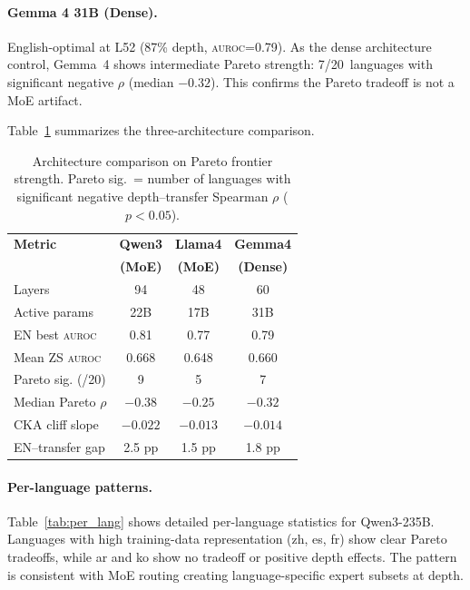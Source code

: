 \documentclass[11pt,a4paper]{article}
\newcommand{\aur}{\textsc{auroc}}
\newcommand{\cka}{\textsc{CKA}}
\begin{document}
\paragraph{Gemma 4 31B (Dense).} English-optimal at L52 (87\% depth, \aur{}=0.79). As the dense architecture control, Gemma~4 shows intermediate Pareto strength: 7/20~languages with significant negative $\rho$ (median $-0.32$). This confirms the Pareto tradeoff is not a MoE artifact.

Table~\ref{tab:arch_comparison} summarizes the three-architecture comparison.

\begin{table}[t]
\centering
\small
\begin{tabular}{lccc}
\toprule
\textbf{Metric} & \textbf{Qwen3} & \textbf{Llama4} & \textbf{Gemma4} \\
 & \textbf{(MoE)} & \textbf{(MoE)} & \textbf{(Dense)} \\
\midrule
Layers & 94 & 48 & 60 \\
Active params & 22B & 17B & 31B \\
EN best \aur{} & 0.81 & 0.77 & 0.79 \\
Mean ZS \aur{} & 0.668 & 0.648 & 0.660 \\
Pareto sig. (/20) & 9 & 5 & 7 \\
Median Pareto $\rho$ & $-0.38$ & $-0.25$ & $-0.32$ \\
\cka{} cliff slope & $-0.022$ & $-0.013$ & $-0.014$ \\
EN--transfer gap & 2.5 pp & 1.5 pp & 1.8 pp \\
\bottomrule
\end{tabular}
\caption{Architecture comparison on Pareto frontier strength. Pareto sig.\ = number of languages with significant negative depth--transfer Spearman $\rho$ ($p<0.05$).}
\label{tab:arch_comparison}
\end{table}

\paragraph{Per-language patterns.}
Table~\ref{tab:per_lang} shows detailed per-language statistics for Qwen3-235B. Languages with high training-data representation (zh, es, fr) show clear Pareto tradeoffs, while ar and ko show no tradeoff or positive depth effects. The pattern is consistent with MoE routing creating language-specific expert subsets at depth.
\end{document}
